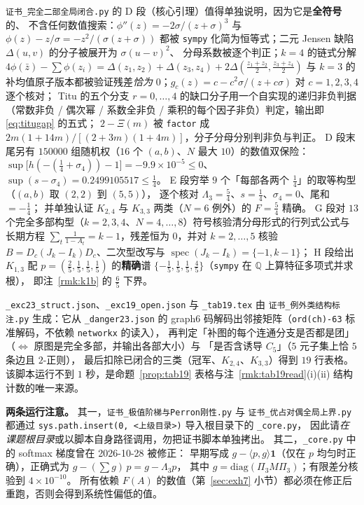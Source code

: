 \documentclass[UTF8,11pt]{ctexart}
\theoremstyle{definition}
\newcommand{\Lam}{\Lambda}
\newcommand{\Q}{\mathbb{Q}}
\newcommand{\one}{\mathbf{1}}
\begin{document}
\texttt{证书\_完全二部全局闭合.py} 的 D 段（核心引理）值得单独说明，因为它是\textbf{全符号}的、
不含任何数值搜索：$\phi''(z)=-2\sigma/(z+\sigma)^3$ 与 $\phi(z)-z/\sigma=-z^2/(\sigma(z+\sigma))$
都被 \texttt{sympy} 化简为恒等式；二元 Jensen 缺陷 $\Delta(u,v)$ 的分子被展开为 $\sigma(u-v)^2$、
分母系数被逐个判正；$k=4$ 的链式分解 $4\phi(\bar z)-\sum\phi(z_i)=\Delta(z_1,z_2)+\Delta(z_3,z_4)+2\Delta(\frac{z_1+z_2}2,\frac{z_3+z_4}2)$
与 $k=3$ 的补均值原子版本都被验证残差\emph{恰为} $0$；$g_c(z)=c-c^2\sigma/(z+c\sigma)$ 对 $c=1,2,3,4$ 逐个核对；
Titu 的五个分支 $r=0,\dots,4$ 的缺口分子用一个自实现的递归非负判据
（常数非负 / 偶次幂 / 系数全非负 / 乘积的每个因子非负）判定，输出即 \eqref{eq:titugap} 的五式；
$2-\Xi(m)$ 被 \texttt{factor} 成 $2m(1+14m)/[(2+3m)(1+4m)]$，分子分母分别判非负与判正。
D 段末尾另有 $150000$ 组随机权（$16$ 个 $(a,b)$、$N$ 最大 $10$）的数值双保险：
$\sup\bigl[h(-(\frac14+\sigma_4))-1\bigr]=-9.9\times10^{-5}\le0$、$\sup(s-\sigma_4)=0.2499105517\le\frac14$。
E 段穷举 $9$ 个「每部各两个 $\frac14$」的取等构型（$(a,b)$ 取 $(2,2)$ 到 $(5,5)$），
逐个核对 $\Lam_3=\frac54$、$s=\frac14$、$\sigma_4=0$、尾和 $=-\frac14$；
并单独认证 $K_{2,4}$ 与 $K_{3,3}$ 两类（$N=6$ 例外）的 $F=\frac54$ 精确。
G 段对 $13$ 个完全多部构型（$k=2,3,4$、$N=4,\dots,8$）符号核验清分母形式的行列式公式与
长期方程 $\sum_t\frac1{1-A_t}=k-1$，残差恒为 $0$，并对 $k=2,\dots,5$ 核验
$B=D_c(J_k-I_k)D_c$、二次型改写与 $\operatorname{spec}(J_k-I_k)=\{-1,k-1\}$；
H 段给出 $K_{1,3}$ 配 $p=(\frac25,\frac15,\frac15,\frac15)$ 的\textbf{精确}谱
$\{-\frac15,\frac15,\frac15,\frac45\}$（\texttt{sympy} 在 $\Q$ 上算特征多项式并求根），
即注~\ref{rmk:k1b} 的 $\frac65$ 下界。

\begin{sloppypar}
\texttt{\_exc23\_struct.json}、\texttt{\_exc19\_open.json} 与 \texttt{\_tab19.tex}
由 \texttt{证书\_例外类结构标注.py} 生成：它从 \texttt{\_danger23.json}
的 graph6 码解码出邻接矩阵（\texttt{ord(ch)-63} 标准解码，不依赖 \texttt{networkx} 的读入），
再判定「补图的每个连通分支是否都是团」（$\iff$ 原图是完全多部，并输出各部大小）与
「是否含诱导 $C_5$」（$5$ 元子集上恰 $5$ 条边且 $2$-正则），
最后扣除已闭合的三类（冠军、$K_{2,4}$、$K_{3,3}$）得到 $19$ 行表格。
该脚本运行不到 $1$ 秒，是命题~\ref{prop:tab19} 表格与注~\ref{rmk:tab19read}(i)(ii) 结构计数的唯一来源。
\end{sloppypar}

\medskip
\noindent\textbf{两条运行注意。}
其一，\texttt{证书\_极值阶梯与Perron刚性.py} 与 \texttt{证书\_优占对偶全局上界.py} 都通过
\texttt{sys.path.insert(0, <上级目录>)} 导入根目录下的 \texttt{\_core.py}，
因此请\emph{在课题根目录}或以脚本自身路径调用，勿把证书脚本单独拷出。
其二，\texttt{\_core.py} 中的 softmax 梯度曾在 2026-10-28 被修正：
早期写成 $g-\langle p,g\rangle\one$（仅在 $p$ 均匀时正确），正确式为 $g-(\sum g)\,p=g-\Lam_3p$，
其中 $g=\mathrm{diag}(\Pi_3M\Pi_3)$；有限差分核验到 $4\times10^{-10}$。
所有依赖 $F(A)$ 的数值（第~\ref{sec:exh7} 小节）都必须在修正后重跑，否则会得到系统性偏低的值。
\end{document}
